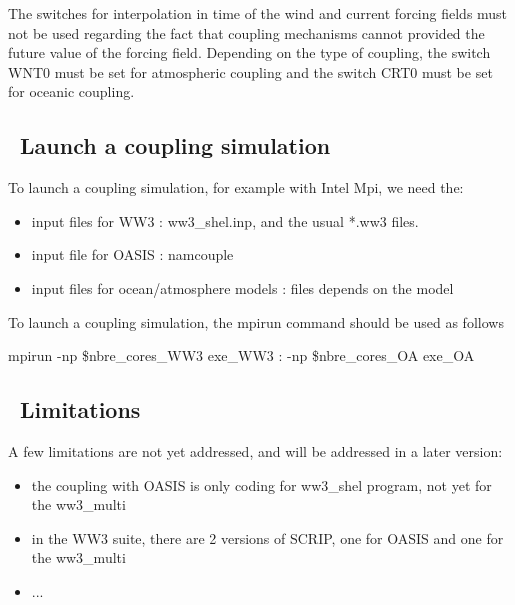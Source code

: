 The switches for interpolation in time of the wind and current forcing fields must not be used regarding the
fact that coupling mechanisms cannot provided the future value of the forcing field.
Depending on the type of coupling, the switch WNT0 must be set for atmospheric coupling and the switch CRT0 must be set for oceanic coupling.

\vssub
\subsection{~Launch a coupling simulation} \label{sec:couplingC}
\vssub

To launch a coupling simulation, for example with Intel Mpi, we need the: 

\begin{itemize}
\item input files for WW3 : {\file ww3\_shel.inp}, and the usual *.ww3 files.
\item input file for OASIS : {\file namcouple}
\item input files for ocean/atmosphere models : {\file files depends on the model}
\end{itemize}

To launch a coupling simulation, the {\file mpirun} command should be used as follows

{\code mpirun -np \$nbre\_cores\_WW3 exe\_WW3 : -np \$nbre\_cores\_OA exe\_OA}

\vssub
\subsection{~Limitations} \label{sec:couplingD}
\vssub

A few limitations are not yet addressed, and will be addressed in a later version:

\begin{itemize}
\item the coupling with OASIS is only coding for ww3\_shel program, not yet for the {\code ww3\_multi}
\item in the WW3 suite, there are 2 versions of SCRIP, one for OASIS and one for the {\code ww3\_multi}
\item ...
\end{itemize}
